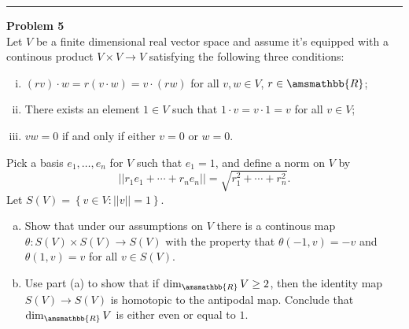 \documentclass[letterpaper, 12pt]{article}
\newenvironment{problem}[2][Problem]
		{ \begin{mdframed}[backgroundcolor=gray!20] \textbf{#1 #2} \\}
		{  \end{mdframed}}
\renewcommand{\mathbb}{\amsmathbb}
\begin{document}
\noindent\rule{7in}{2.8pt}
\begin{problem}{5}
Let \(V\) be a finite dimensional real vector space and assume it's equipped with a continous product \(V\times V\rightarrow V\) satisfying the following three conditions:
\begin{enumerate}[(i)]
\item \((rv)\cdot w=r(v\cdot w)=v\cdot (rw)\) for all \(v,w\in V\), \(r\in \mathbb{R}\); 
\item There exists an element \(1\in V\) such that \(1\cdot v=v\cdot 1=v\) for all \(v\in V\); 
\item \(vw=0\) if and only if either \(v=0\) or \(w=0\).
\end{enumerate}
Pick a basis \(e_1,\ldots,e_n\) for \(V\) such that \(e_1=1\), and define a norm on \(V\) by \
\[||r_1e_1+\cdots+r_ne_n||=\sqrt{r_1^2+\cdots+r_n^2}.\]
Let \(S(V)=\left\{ v\in V:||v||=1 \right\}\).
\begin{enumerate}[(a)]
\item Show that under our assumptions on \(V\) there is a continous map \(\theta:S(V)\times S(V)\rightarrow S(V)\) with the property that \(\theta(-1,v)=-v\) and \(\theta(1,v)=v\) for all \(v\in S(V)\). 
\item Use part (a) to show that if \(\dim_{\mathbb{R}}V\geq 2\), then the identity map \(S(V)\rightarrow S(V)\) is homotopic to the antipodal map. Conclude that \(\dim_{\mathbb{R}}V\) is either even or equal to \(1\).
\end{enumerate}
\end{problem}
\end{document}
